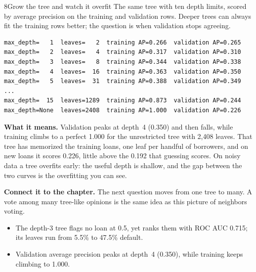 \begin{labquestion}{8}{Grow the tree and watch it overfit}
The same tree with ten depth limits, scored by average precision on the training and validation rows. Deeper trees can always fit the training rows better; the question is when validation stops agreeing.
\end{labquestion}
\begin{labanswer}

\begin{refoutput}
\begin{lstlisting}[style=utpterminal]
max_depth=   1  leaves=   2  training AP=0.266  validation AP=0.265
max_depth=   2  leaves=   4  training AP=0.317  validation AP=0.310
max_depth=   3  leaves=   8  training AP=0.344  validation AP=0.338
max_depth=   4  leaves=  16  training AP=0.363  validation AP=0.350
max_depth=   5  leaves=  31  training AP=0.388  validation AP=0.349
...
max_depth=  15  leaves=1289  training AP=0.873  validation AP=0.244
max_depth=None  leaves=2408  training AP=1.000  validation AP=0.226
\end{lstlisting}
\end{refoutput}

\textbf{What it means.} Validation peaks at depth~4 (0.350) and then falls, while training climbs to a perfect 1.000 for the unrestricted tree with 2,408 leaves. That tree has memorized the training loans, one leaf per handful of borrowers, and on new loans it scores 0.226, little above the 0.192 that guessing scores. On noisy data a tree overfits early: the useful depth is shallow, and the gap between the two curves is the overfitting you can see.
\end{labanswer}

\textbf{Connect it to the chapter.} The next question moves from one tree to many. A vote among many tree-like opinions is the same idea as this picture of neighbors voting.


\begin{labcheckpoint}
\begin{itemize}[leftmargin=1.2em,itemsep=2pt,topsep=1pt]
  \item The depth-3 tree flags no loan at 0.5, yet ranks them with ROC AUC 0.715; its leaves run from 5.5\% to 47.5\% default.
  \item Validation average precision peaks at depth~4 (0.350), while training keeps climbing to 1.000.
\end{itemize}
\end{labcheckpoint}

